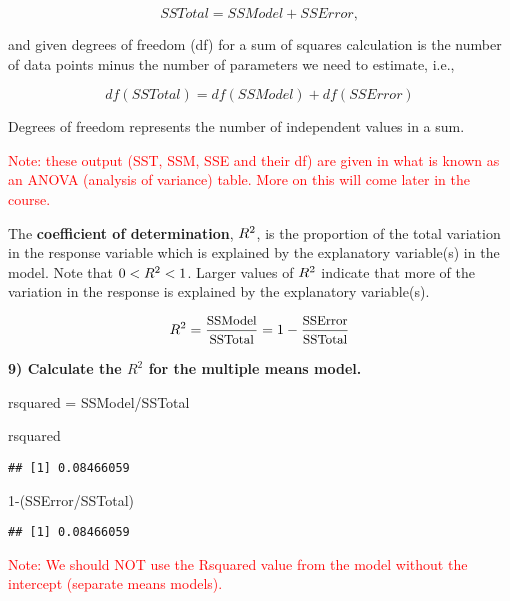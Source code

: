\documentclass[
]{article}
\newenvironment{Shaded}{\begin{snugshade}}{\end{snugshade}}
\newcommand{\DecValTok}[1]{\textcolor[rgb]{0.00,0.00,0.81}{#1}}
\newcommand{\NormalTok}[1]{#1}
\newcommand{\OtherTok}[1]{\textcolor[rgb]{0.56,0.35,0.01}{#1}}
\newcommand{\SpecialCharTok}[1]{\textcolor[rgb]{0.00,0.00,0.00}{#1}}
\begin{document}
\[SSTotal = SSModel + SSError,\]

and given degrees of freedom (df) for a sum of squares calculation is
the number of data points minus the number of parameters we need to
estimate, i.e.,

\[df(SSTotal) = df(SSModel) + df(SSError)\]

Degrees of freedom represents the number of independent values in a sum.

\textcolor{red}{Note: these output (SST, SSM, SSE and their df) are given in what is known as an ANOVA (analysis of variance) table. More on this will come later in the course.}

The \textbf{coefficient of determination}, \(\small{R^2}\), is the
proportion of the total variation in the response variable which is
explained by the explanatory variable(s) in the model. Note that
\(0< \small{R^2} <1\). Larger values of \(\small{R^2}\) indicate that
more of the variation in the response is explained by the explanatory
variable(s).

\[\small{R^2}  = \frac{\text{SSModel}}{\text{SSTotal}} = 1-\frac{\text{SSError}}{\text{SSTotal}}\]

\textbf{9) Calculate the \(R^2\) for the multiple means model.}

\begin{Shaded}
\begin{Highlighting}[]
\NormalTok{rsquared }\OtherTok{=}\NormalTok{ SSModel}\SpecialCharTok{/}\NormalTok{SSTotal}

\NormalTok{rsquared       }
\end{Highlighting}
\end{Shaded}

\begin{verbatim}
## [1] 0.08466059
\end{verbatim}

\begin{Shaded}
\begin{Highlighting}[]
\DecValTok{1}\SpecialCharTok{{-}}\NormalTok{(SSError}\SpecialCharTok{/}\NormalTok{SSTotal)}
\end{Highlighting}
\end{Shaded}

\begin{verbatim}
## [1] 0.08466059
\end{verbatim}

\textcolor{red}{Note: We should NOT use the Rsquared value from the model without the intercept (separate means models).}
\end{document}
